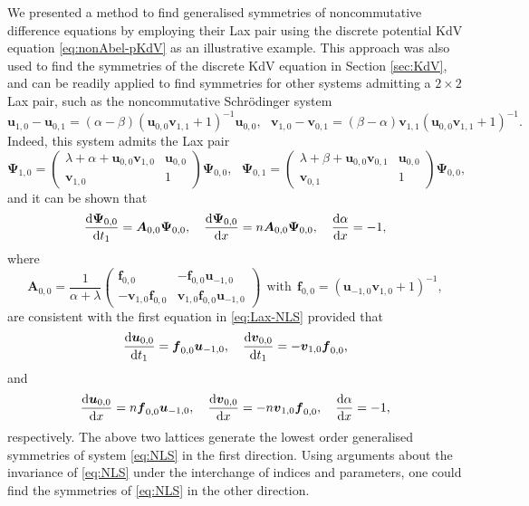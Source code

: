 \documentclass[dvips,10pt]{article}
\newcommand{\bs}{\boldsymbol}
\newcommand{\bsu}{ {\bs{u}}}
\newcommand{\bsf}{ {\bs{f}}}
\newcommand{\bsv}{ {\bs{v}}}
\theoremstyle{remark} %
\begin{document}
	We presented a method to find generalised symmetries of noncommutative difference equations by employing their Lax pair using the discrete potential KdV equation \eqref{eq:nonAbel-pKdV} as an illustrative example. This approach was also used to find the symmetries of the discrete KdV equation in Section \ref{sec:KdV}, and can be readily applied to find symmetries for other systems admitting a $2 \times 2$ Lax pair, such as the noncommutative Schr\"odinger system \cite{KRX}
	\begin{equation} \label{eq:NLS}
		{\bs{u}}_{1,0}	- \bsu_{0,1} =  (\alpha-\beta) (\bsu_{0,0} \bsv_{1,1}+1)^{-1} \bsu_{0,0}, ~~~ {\bs{v}}_{1,0}	- \bsv_{0,1} = (\beta-\alpha) \bsv_{1,1} (\bsu_{0,0} \bsv_{1,1}+1)^{-1}.
	\end{equation}
	Indeed, this system admits the Lax pair
	\begin{equation} \label{eq:Lax-NLS}
		{\bs{\Psi}}_{1,0} = \begin{pmatrix}
			\lambda + \alpha + \bsu_{0,0} \bsv_{1,0} & \bsu_{0,0} \\ \bsv_{1,0} & 1
		\end{pmatrix}{\bs{\Psi}}_{0,0} , ~~~ 	{\bs{\Psi}}_{0,1} = \begin{pmatrix}
			\lambda + \beta + \bsu_{0,0} \bsv_{0,1} & \bsu_{0,0} \\ \bsv_{0,1} & 1
		\end{pmatrix}{\bs{\Psi}}_{0,0},
	\end{equation}
	and it can be shown that
	$$ 	\frac{{\rm{d}} {\bs{\Psi}}_{0,0}}{{\rm{d}} t_1} = {\bs{A}}_{0,0} {\bs{\Psi}}_{0,0}, ~~~ \frac{{\rm{d}} {\bs{\Psi}}_{0,0}}{{\rm{d}} x} =n {\bs{A}}_{0,0} {\bs{\Psi}}_{0,0} , ~~~ \frac{{\rm{d}} \alpha}{{\rm{d}} x} = -1,$$
	where
	$$ {\bs{A}}_{0,0} = \frac{1}{\alpha+\lambda} \begin{pmatrix}
		\bsf_{0,0}  & - \bsf_{0,0} \bsu_{-1,0} \\ 
		-\bsv_{1,0} \bsf_{0,0} &  \bsv_{1,0} \bsf_{0,0} \bsu_{-1,0}
	\end{pmatrix} ~~ {\text{with}} ~~\bsf_{0,0} = (\bsu_{-1,0} \bsv_{1,0}+1)^{-1}, $$
	are consistent with the first equation in \eqref{eq:Lax-NLS} provided that
	$$ 	\frac{{\rm{d}} {\bs{u}}_{0,0}}{{\rm{d}} t_1} = \bsf_{0,0} \bsu_{-1,0} , ~~~  \frac{{\rm{d}} {\bs{v}}_{0,0}}{{\rm{d}} t_1} = -\bsv_{1,0} \bsf_{0,0}, $$
	and
	$$ 	\frac{{\rm{d}} {\bs{u}}_{0,0}}{{\rm{d}} x} = n \bsf_{0,0} \bsu_{-1,0} , ~~~ 	\frac{{\rm{d}} {\bs{v}}_{0,0}}{{\rm{d}} x} = -n \bsv_{1,0} \bsf_{0,0}, ~~~ \frac{{\rm{d}} \alpha}{{\rm{d}} x} = -1, $$
	respectively. The above two lattices generate the lowest order generalised symmetries of system \eqref{eq:NLS} in the first direction. Using arguments about the invariance of \eqref{eq:NLS} under the interchange of indices and parameters, one could find the symmetries of \eqref{eq:NLS} in the other direction.
	
\end{document}
